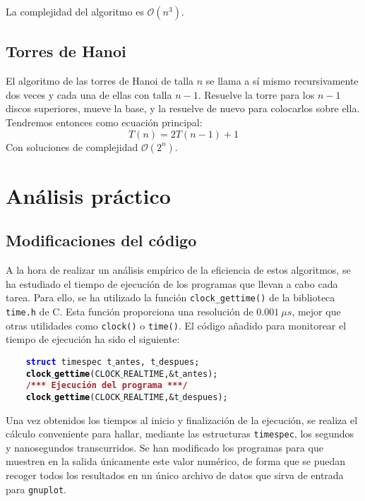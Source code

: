 \documentclass[a4paper, 11pt]{article} %
\begin{document}
La complejidad del algoritmo es $\mathcal{O}(n^3)$.


\subsection{Torres de Hanoi}
El algoritmo de las torres de Hanoi de talla $n$ se llama a sí mismo recursivamente dos veces y cada una de ellas con
talla $n-1$. Resuelve la torre para los $n-1$ discos superiores, mueve la base, y la resuelve de nuevo para colocarlos sobre ella.
Tendremos entonces como ecuación principal:
\begin{equation}
 T(n) = 2T(n-1) + 1
\end{equation}
Con soluciones de complejidad $\mathcal{O}(2^n)$.

\section {Análisis práctico}
\subsection{Modificaciones del código}
A la hora de realizar un análisis empírico de la eficiencia de estos algoritmos, se ha estudiado el tiempo de ejecución de los programas que llevan a cabo cada tarea.
Para ello, se ha utilizado la función \texttt{clock\_gettime()} de la biblioteca \texttt{time.h} de C. Esta función proporciona una resolución de $0.001\ \mu s$, mejor
que otras utilidades como \texttt{clock()} o \texttt{time()}. El código añadido para monitorear el tiempo de ejecución ha sido el siguiente:

\texttt{\mbox{}\ \ \ \ \textbf{\textcolor{Blue}{struct}}\ \textcolor{TealBlue}{timespec}\ t$\_$antes\textcolor{BrickRed}{,}\ t$\_$despues\textcolor{BrickRed}{;} \\
\mbox{}\ \ \ \ \textbf{\textcolor{Black}{clock$\_$gettime}}\textcolor{BrickRed}{(}CLOCK$\_$REALTIME\textcolor{BrickRed}{,\&}t$\_$antes\textcolor{BrickRed}{);} \\
\mbox{}\ \ \ \ \textbf{\textcolor{Brown}{/*** Ejecución del programa ***/}} \\
\mbox{}\ \ \ \ \textbf{\textcolor{Black}{clock$\_$gettime}}\textcolor{BrickRed}{(}CLOCK$\_$REALTIME\textcolor{BrickRed}{,\&}t$\_$despues\textcolor{BrickRed}{);} \\}

Una vez obtenidos los tiempos al inicio y finalización de la ejecución, se realiza el cálculo conveniente para hallar, mediante las estructuras \texttt{timespec},
los segundos y nanosegundos transcurridos. Se han modificado los programas para que muestren en la salida únicamente este valor numérico, de forma que se puedan recoger
todos los resultados en un único archivo de datos que sirva de entrada para \texttt{gnuplot}.
\end{document}
